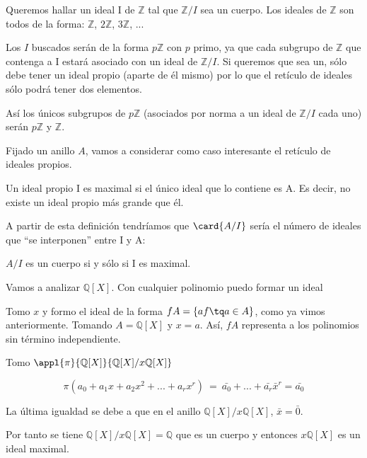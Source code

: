 \documentclass[nochap]{apuntes}
\begin{document}
\begin{example}
 Queremos hallar un ideal I de $\mathbb{Z}$ tal que $\mathbb{Z}/I$  sea un cuerpo.  Los ideales de $\mathbb{Z}$ son todos de la forma: $\mathbb{Z}$, $2\mathbb{Z}$, $3\mathbb{Z}$, ...

 Los $I$ buscados serán de la forma $p\mathbb{Z}$  con $p$ primo, ya que cada subgrupo de $\mathbb{Z}$ que contenga a I estará asociado con un ideal de $\mathbb{Z}/I$. Si queremos que sea un, sólo debe tener un ideal propio (aparte de él mismo) por lo que el retículo de ideales sólo podrá tener dos elementos.

 Así los únicos subgrupos de $p\mathbb{Z}$  (asociados por norma a un ideal de $\mathbb{Z}/I$  cada uno) serán $p\mathbb{Z}$  y $\mathbb{Z}$.
\end{example}

Fijado un anillo $A$, vamos a considerar como caso interesante el retículo de ideales propios.

\begin{defn}
 Un ideal propio I es maximal si el único ideal que lo contiene es A. Es decir, no existe un ideal propio más grande que él.
\end{defn}

A partir de esta definición tendríamos que  $\card{A/I}$ sería el número de ideales que ``se interponen''  entre I y A:

\begin{lemma}
$A/I$ es un cuerpo si y sólo si I es maximal.
\end{lemma}

\begin{example} Vamos a analizar $ℚ[X]$. Con cualquier polinomio puedo formar un ideal

 Tomo $x$ y formo el ideal de la forma $fA=\{af \tq a\in A\}$, como ya vimos anteriormente. Tomando $A=\mathbb{Q}[X]$ y $x=a$. Así, $fA$ representa a los polinomios sin término independiente.

 Tomo $\appl{\pi}{\mathbb{Q}[X]}{\mathbb{Q}[X]/x\mathbb{Q}[X]}$

 \[\pi(a_0+a_1x+a_2x^{2}+...+a_rx^{r}) \ = \ \bar{a_0}+...+\bar{a_r}\bar{x}^{r} = \bar{a_0}\]

 La última igualdad se debe a que en el anillo $\mathbb{Q}[X]/x\mathbb{Q}[X]$, $\bar{x}=\bar{0}$.

 Por tanto se tiene $\mathbb{Q}[X]/x\mathbb{Q}[X]=\mathbb{Q}$  que es un cuerpo y entonces $x\mathbb{Q}[X]$  es un ideal maximal.
\end{example}
\end{document}
